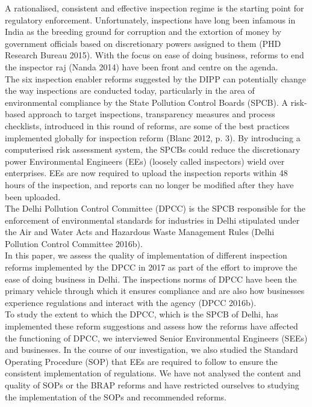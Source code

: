 \documentclass[a4paper, 12pt]{article}
\begin{document}
                  A rationalised, consistent and effective inspection regime is the starting point for regulatory enforcement. Unfortunately, inspections have long been infamous in India as the breeding ground for corruption and the extortion of money by government officials based on discretionary powers assigned to them (PHD Research Bureau 2015). With the focus on ease of doing business, reforms to end the inspector raj (Nanda 2014) have been front and centre on the agenda. \\
                  
                  The six inspection enabler reforms suggested by the DIPP can potentially change the way inspections are conducted today, particularly in the area of environmental compliance by the State Pollution Control Boards (SPCB). A risk-based approach to target inspections, transparency measures and process checklists, introduced in this round of reforms, are some of the best practices implemented globally for inspection reform (Blanc 2012, p. 3). By introducing a computerised risk assessment system, the SPCBs could reduce the discretionary power Environmental Engineers (EEs) (loosely called inspectors) wield over enterprises. EEs are now required to upload the inspection reports within 48 hours of the inspection, and reports can no longer be modified after they have been uploaded. \\
                  
                 The Delhi Pollution Control Committee (DPCC) is the SPCB responsible for the enforcement of environmental standards for industries in Delhi stipulated under the Air and Water Acts and Hazardous Waste Management Rules (Delhi Pollution Control Committee 2016b). \\
                 
                 In this paper, we assess the quality of implementation of different inspection reforms implemented by the DPCC in 2017 as part of the effort to improve the ease of doing business in Delhi. The inspections norms of DPCC have been the primary vehicle through which it ensures compliance and are also how businesses experience regulations and interact with the agency (DPCC 2016b). \\
                 
                 To study the extent to which the DPCC, which is the SPCB of Delhi, has implemented these reform suggestions and assess how the reforms have affected the functioning of DPCC, we interviewed Senior Environmental Engineers (SEEs) and businesses. In the course of our investigation, we also studied the Standard Operating Procedure (SOP) that EEs are required to follow to ensure the consistent implementation of regulations. We have not analysed the content and quality of SOPs or the BRAP reforms and have restricted ourselves to studying the implementation of the SOPs and recommended reforms. \\
                 
\end{document}
